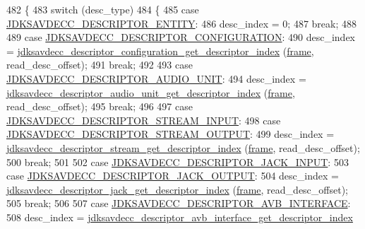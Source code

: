 \begin{DoxyCode}
482 \{
483     \textcolor{keywordflow}{switch} (desc\_type)
484     \{
485     \textcolor{keywordflow}{case} \hyperlink{group__descriptor_gaf06b7a0bf808dc8e3104511947d694c4}{JDKSAVDECC\_DESCRIPTOR\_ENTITY}:
486         desc\_index = 0;
487         \textcolor{keywordflow}{break};
488 
489     \textcolor{keywordflow}{case} \hyperlink{group__descriptor_ga645687847f92dc28bcb37a7c334cb875}{JDKSAVDECC\_DESCRIPTOR\_CONFIGURATION}:
490         desc\_index = \hyperlink{group__descriptor__configuration_ga25a1868246dd5a8f9e0a6c0dd6e40526}{jdksavdecc\_descriptor\_configuration\_get\_descriptor\_index}
      (\hyperlink{gst__avb__playbin_8c_ac8e710e0b5e994c0545d75d69868c6f0}{frame}, read\_desc\_offset);
491         \textcolor{keywordflow}{break};
492 
493     \textcolor{keywordflow}{case} \hyperlink{group__descriptor_gab23787344ad4773f6486ee9d4bfa4cd2}{JDKSAVDECC\_DESCRIPTOR\_AUDIO\_UNIT}:
494         desc\_index = \hyperlink{group__descriptor__audio_gaa38833b7503f98f35a7047d138c55d63}{jdksavdecc\_descriptor\_audio\_unit\_get\_descriptor\_index}
      (\hyperlink{gst__avb__playbin_8c_ac8e710e0b5e994c0545d75d69868c6f0}{frame}, read\_desc\_offset);
495         \textcolor{keywordflow}{break};
496 
497     \textcolor{keywordflow}{case} \hyperlink{group__descriptor_ga4eb0b7597f11b5fc36f3625acd82e503}{JDKSAVDECC\_DESCRIPTOR\_STREAM\_INPUT}:
498     \textcolor{keywordflow}{case} \hyperlink{group__descriptor_gab458eb4963f42bfa5591d5dd604bedce}{JDKSAVDECC\_DESCRIPTOR\_STREAM\_OUTPUT}:
499         desc\_index = \hyperlink{group__descriptor__stream_ga7eb3ff210854a696a1cdd135facd81fb}{jdksavdecc\_descriptor\_stream\_get\_descriptor\_index}
      (\hyperlink{gst__avb__playbin_8c_ac8e710e0b5e994c0545d75d69868c6f0}{frame}, read\_desc\_offset);
500         \textcolor{keywordflow}{break};
501 
502     \textcolor{keywordflow}{case} \hyperlink{group__descriptor_ga3b09048c81f346536a2a09b4a721b006}{JDKSAVDECC\_DESCRIPTOR\_JACK\_INPUT}:
503     \textcolor{keywordflow}{case} \hyperlink{group__descriptor_ga012212e365b658b5cbcb27357a236404}{JDKSAVDECC\_DESCRIPTOR\_JACK\_OUTPUT}:
504         desc\_index = \hyperlink{group__descriptor__jack_ga87120a7dafd647c7aa3f0903b8cf183a}{jdksavdecc\_descriptor\_jack\_get\_descriptor\_index}
      (\hyperlink{gst__avb__playbin_8c_ac8e710e0b5e994c0545d75d69868c6f0}{frame}, read\_desc\_offset);
505         \textcolor{keywordflow}{break};
506 
507     \textcolor{keywordflow}{case} \hyperlink{group__descriptor_ga8188eeefbd66dd49e6cf72abb5e1d11e}{JDKSAVDECC\_DESCRIPTOR\_AVB\_INTERFACE}:
508         desc\_index = \hyperlink{group__descriptor__avb__interface_ga0473b9e480558f799641f95d41ffb3ed}{jdksavdecc\_descriptor\_avb\_interface\_get\_descriptor\_index}

\end{DoxyCode}

